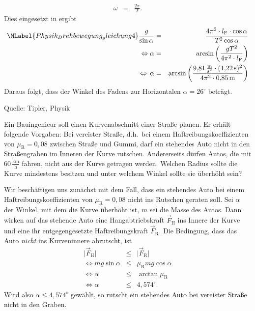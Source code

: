\begin{MExercises}
\begin{MExercise}
\begin{MSolution}
\begin{eqnarray*}
    \omega&=&\frac{2\pi}{T}.
  \end{eqnarray*}
    Dies eingesetzt in  ergibt
    \begin{eqnarray}\MLabel{Physik_Drehbewegung_gleichung4}
    \nonumber\frac{g}{\sin\alpha}&=&\frac{4\pi^2\cdot l_{\textrm{F}}\cdot\cos\alpha}{T^2\cos\alpha}\\
    \Leftrightarrow \alpha&=&\arcsin\left(\frac{gT^2}{4\pi^2\cdot l_{\textrm{F}}}\right)\\
    \nonumber\,\Leftrightarrow\, \alpha&=&\arcsin\left(\frac{9{,}81\,\frac{\text{m}}{\text{s}^2}\cdot(1{,}22\,\text{s})^2}{4\pi^2\cdot 0{,}85\,\text{m}}\right)
    \end{eqnarray} Daraus folgt, dass der Winkel des Fadens zur Horizontalen $\alpha=26^{\circ}$ betr\"agt.
  \end{MSolution}
  
  Quelle: Tipler, Physik
  \end{MExercise}
  
  
  \begin{MExercise}
  Ein Bauingenieur soll einen Kurvenabschnitt einer Stra{\ss}e planen. Er erh\"alt folgende Vorgaben: Bei vereister Stra{\ss}e, d.h.~bei einem Haftreibungskoeffizienten von $\mu_{\textrm{R}}=0{,}08$ zwischen Stra{\ss}e und Gummi, darf ein stehendes Auto nicht in den Stra{\ss}engraben im Inneren der Kurve rutschen. Andererseits d\"urfen Autos, die mit $60\,\frac{\text{km}}{\text{h}}$ fahren, nicht aus der Kurve getragen werden. Welchen Radius sollte die Kurve mindestens besitzen und unter welchem Winkel sollte sie \"uberh\"oht sein?
  
  \begin{MSolution}
  Wir besch\"aftigen uns zun\"achst mit dem Fall, dass ein stehendes Auto bei einem Haftreibungskoeffizienten von $\mu_{\textrm{R}}=0{,}08$ nicht ins Rutschen geraten soll. Sei $\alpha$ der Winkel, mit dem die Kurve \"uberh\"oht ist, $m$ sei die Masse des Autos. Dann wirken auf das stehende Auto eine Hangabtriebskraft $\vec{F}_{\textrm{H}}$ ins Innere der Kurve und eine ihr entgegengesetzte Haftreibungskraft $\vec{F}_{\textrm{R}}$. Die Bedingung, dass das Auto \emph{nicht} ins Kurveninnere abrutscht, ist
  \begin{eqnarray*}
  \vert\vec{F}_{\textrm{H}}\vert&\le&\vert\vec{F}_{\textrm{R}}\vert\\
  \Leftrightarrow mg\sin\alpha&\le& \mu_{\textrm{R}} mg\cos\alpha\\
  \Leftrightarrow \alpha&\le&\arctan\mu_{\textrm{R}}\\
  \Leftrightarrow \alpha&\le& 4{,}574^{\circ}.
  \end{eqnarray*} Wird also $\alpha\le 4{,}574^{\circ}$ gew\"ahlt, so rutscht ein stehendes Auto bei vereister Stra{\ss}e nicht in den Graben.\\
  

\end{MSolution}
\end{MExercise}
\end{MExercises}
